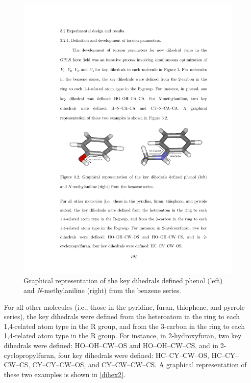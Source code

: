 \documentclass[12pt]{report}
\begin{document}
\begin{figure}[ht]
\centering
\includegraphics[scale=0.999]{figures/pdf/dihex.pdf}
\caption{Graphical representation of the key dihedrals defined phenol (left) and \textit{N}-methylaniline (right) from the benzene series.}
\label{dihex}
\end{figure}

For all other molecules (i.e., those in the pyridine, furan, thiophene, and pyrrole series), the key dihedrals were defined from the heteroatom in the ring to each 1,4-related atom type in the R group, and from the 3-carbon in the ring to each 1,4-related atom type in the R group. For instance, in 2-hydroxyfuran, two key dihedrals were defined: HO--OH--CW--OS and HO--OH--CW--CS, and in 2-cyclopropylfuran, four key dihedrals were defined: 
HC--CY--CW--OS, HC--CY--CW--CS, CY--CY--CW--OS, and CY--CW--CW--CS. A graphical representation of these two examples is shown in \cref{dihex2}. 
\end{document}
